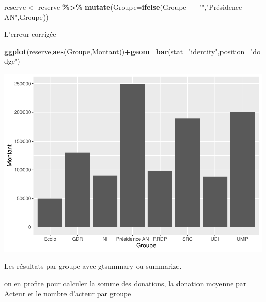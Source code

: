 \documentclass[
]{book}
\newenvironment{Shaded}{\begin{snugshade}}{\end{snugshade}}
\newcommand{\AttributeTok}[1]{\textcolor[rgb]{0.13,0.29,0.53}{#1}}
\newcommand{\FunctionTok}[1]{\textcolor[rgb]{0.13,0.29,0.53}{\textbf{#1}}}
\newcommand{\NormalTok}[1]{#1}
\newcommand{\OtherTok}[1]{\textcolor[rgb]{0.56,0.35,0.01}{#1}}
\newcommand{\SpecialCharTok}[1]{\textcolor[rgb]{0.81,0.36,0.00}{\textbf{#1}}}
\newcommand{\StringTok}[1]{\textcolor[rgb]{0.31,0.60,0.02}{#1}}
\begin{document}
\begin{Shaded}
\begin{Highlighting}[]
\NormalTok{reserve }\OtherTok{\textless{}{-}}\NormalTok{ reserve }\SpecialCharTok{\%\textgreater{}\%} \FunctionTok{mutate}\NormalTok{(}\AttributeTok{Groupe=}\FunctionTok{ifelse}\NormalTok{(Groupe}\SpecialCharTok{==}\StringTok{""}\NormalTok{,}\StringTok{"Présidence AN"}\NormalTok{,Groupe))}
\end{Highlighting}
\end{Shaded}

L'erreur corrigée

\begin{Shaded}
\begin{Highlighting}[]
\FunctionTok{ggplot}\NormalTok{(reserve,}\FunctionTok{aes}\NormalTok{(Groupe,Montant))}\SpecialCharTok{+}\FunctionTok{geom\_bar}\NormalTok{(}\AttributeTok{stat=}\StringTok{"identity"}\NormalTok{,}\AttributeTok{position=}\StringTok{"dodge"}\NormalTok{)}
\end{Highlighting}
\end{Shaded}

\includegraphics{_main_files/figure-latex/reserve5-1.pdf}

Les résultats par groupe avec gtsummary ou summarize.

on en profite pour calculer la somme des donations, la donation moyenne par
Acteur et le nombre d'acteur par groupe
\end{document}

